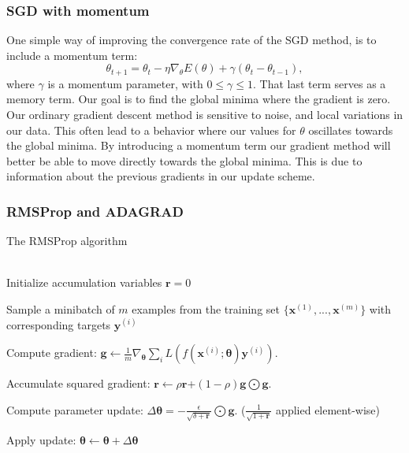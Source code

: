 \subsubsection{SGD with momentum}
One simple way of improving the convergence rate of the SGD method, is to
include a momentum term: 
\begin{equation*}
    \theta _{t+1} = \theta _t - \eta \nabla_\theta E(\theta )+\gamma (\theta_t
    -\theta_{t-1}     ) ,
\end{equation*}
where $\gamma $ is a momentum parameter, with $0\leq \gamma \leq1$. That last
term serves as a memory term. Our goal is to find the
global minima where the gradient is zero. Our ordinary gradient descent method
is sensitive to noise, and local variations in our data.
This often lead to a behavior where our values for $\theta $ oscillates
towards the global minima. %
By introducing a momentum term our gradient method will better be able to move
directly towards the global minima. This is due to information about the previous
gradients in our update scheme.     

\subsubsection{RMSProp and ADAGRAD}


\begin{algorithm}
\caption{The RMSProp algorithm}\label{alg:RMSprop}
\begin{algorithmic}
    
    \\
    Initialize accumulation variables $\boldsymbol{r}=0$
    

        Sample a minibatch of $m$ examples from the training set
        $\{\boldsymbol{x}^{(1)}, ..., \boldsymbol{x}^{(m)}\}$ with corresponding
        targets $\boldsymbol{y}^{(i)}$
    \EndWhile

    Compute gradient: $\boldsymbol{g} \gets
    \frac{1}{m}\nabla_{\boldsymbol\theta}
    \sum_{i}L(f(\boldsymbol{x}^{(i)};\boldsymbol{\theta})\boldsymbol{y}^{(i)})$.
    
    Accumulate squared gradient: $\boldsymbol{r} \gets
    \rho\boldsymbol{r}$+$(1-\rho)\boldsymbol{g}\bigodot\boldsymbol{g}$.

    Compute parameter update: 
    $\Delta\boldsymbol{\theta}=-\frac{\epsilon}{\sqrt{\delta+\boldsymbol{r}}}
    \bigodot\boldsymbol{g}$. ($\frac{1}{\sqrt{1+\boldsymbol{r}}}$ applied
    element-wise)
    
    Apply update: $\boldsymbol{\theta}\gets
    \boldsymbol\theta+\Delta\boldsymbol\theta$
\end{algorithmic}
\end{algorithm}
